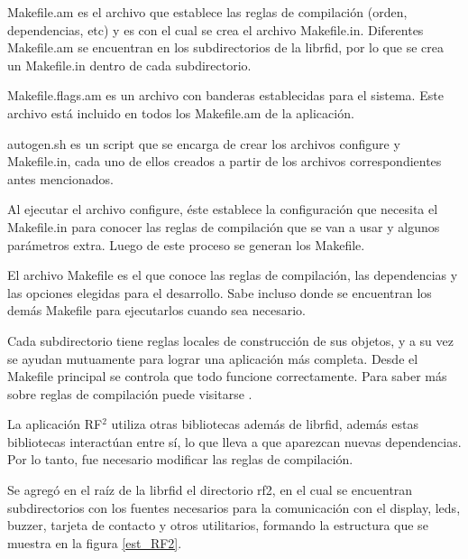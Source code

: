 Makefile.am es el archivo que establece las reglas de compilación (orden, dependencias, etc) y es con el cual se crea el archivo Makefile.in. Diferentes Makefile.am se encuentran en los subdirectorios de la librfid, por lo que se crea un Makefile.in dentro de cada subdirectorio.


Makefile.flags.am es un archivo con banderas establecidas para el sistema. Este archivo está incluido en todos los Makefile.am de la aplicación.


autogen.sh es un script que se encarga de crear los archivos configure y Makefile.in, cada uno de ellos creados a partir de los archivos correspondientes antes mencionados.

Al ejecutar el archivo configure, éste establece la configuración que necesita el Makefile.in para conocer las reglas de compilación que se van a usar y algunos parámetros extra. Luego de este proceso se generan los Makefile.

El archivo Makefile es el que conoce las reglas de compilación, las dependencias y las opciones elegidas para el desarrollo. Sabe incluso donde se encuentran los demás Makefile para ejecutarlos cuando sea necesario.

\bigskip
Cada subdirectorio tiene reglas locales de construcción de sus objetos, y a su vez se ayudan mutuamente para lograr una aplicación más completa. Desde el Makefile principal se controla que todo funcione correctamente.
Para saber más sobre reglas de compilación puede visitarse \cite{Make}.

\bigskip
La aplicación RF$^{2}$ utiliza otras bibliotecas además de librfid, además estas bibliotecas interactúan entre sí, lo que lleva a que aparezcan nuevas dependencias. Por lo tanto, fue necesario modificar las reglas de compilación.

\bigskip
Se agregó en el raíz de la librfid el directorio rf2, en el cual se encuentran subdirectorios con los fuentes necesarios para la comunicación con el display, leds, buzzer, tarjeta de contacto y otros utilitarios, formando la estructura que se muestra en la figura \ref{est_RF2}. 


